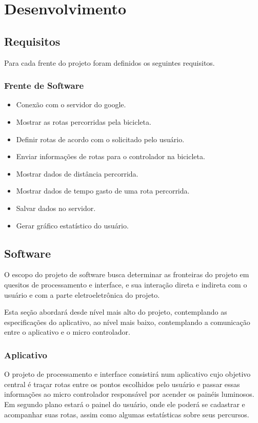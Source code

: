 \chapter{Desenvolvimento}
  \section{Requisitos}
	Para cada frente do projeto foram definidos os seguintes requisitos.
	\subsection{Frente de Software}
	\begin{itemize}
		\item Conexão com o servidor do google.
		\item Mostrar as rotas percorridas pela bicicleta.
		\item Definir rotas de acordo com o solicitado pelo usuário.
		\item Enviar informações de rotas para o controlador na bicicleta.
		\item Mostrar dados de distância percorrida.
		\item Mostrar dados de tempo gasto de uma rota percorrida.
		\item Salvar dados no servidor.
		\item Gerar gráfico estatístico do usuário.
	\end{itemize}
 
  \section{Software}
  O escopo do projeto de software busca determinar as fronteiras do projeto em quesitos de processamento e interface, e sua interação direta e indireta com o usuário e com a parte eletroeletrônica do projeto.

Esta seção abordará desde nível mais alto do projeto, contemplando as especificações do aplicativo, ao nível mais baixo, contemplando a comunicação entre o aplicativo e o micro controlador.

	\subsection{Aplicativo}
O projeto de processamento e interface consistirá num aplicativo cujo objetivo central é traçar rotas entre os pontos escolhidos pelo usuário e passar essas informações ao micro controlador responsável por acender os painéis luminosos. 
Em segundo plano estará o painel do usuário, onde ele poderá se cadastrar e acompanhar suas rotas, assim como algumas estatísticas sobre seus percursos.

